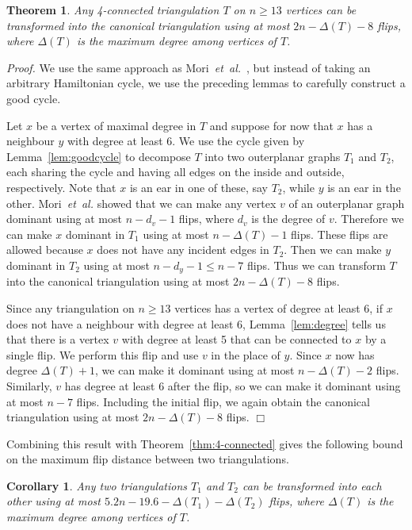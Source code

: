 \pdfoutput=1 \documentclass[12pt]{elsarticle}
\newtheorem{theo}[defin]{Theorem}
\newenvironment{theorem}{\begin{theo} \sl}{\end{theo}}
\newtheorem{coro}[defin]{Corollary}
\newenvironment{corollary}{\begin{coro} \sl}{\end{coro}}
\newenvironment{proof}{\emph{Proof.}}{\hfill $\Box$ \medskip\\}
\newcommand{\etal}{\emph{et~al.}\xspace}
\begin{document}
\begin{theorem}
\label{thm:canonical}
Any 4-connected triangulation $T$ on $n \geq 13$ vertices can be transformed into the canonical triangulation using at most $2n - \Delta(T) - 8$ flips, where $\Delta(T)$ is the maximum degree among vertices of $T$.
\end{theorem}
\begin{proof}
We use the same approach as Mori~\etal~\cite{mori2003diagonal}, but instead of taking an arbitrary Hamiltonian cycle, we use the preceding lemmas to carefully construct a good cycle.

Let $x$ be a vertex of maximal degree in $T$ and suppose for now that $x$ has a neighbour $y$ with degree at least 6. We use the cycle given by Lemma~\ref{lem:goodcycle} to decompose $T$ into two outerplanar graphs $T_1$ and $T_2$, each sharing the cycle and having all edges on the inside and outside, respectively. Note that $x$ is an ear in one of these, say $T_2$, while $y$ is an ear in the other. Mori~\etal showed that we can make any vertex $v$ of an outerplanar graph dominant using at most $n - d_v - 1$ flips, where $d_v$ is the degree of $v$. Therefore we can make $x$ dominant in $T_1$ using at most $n - \Delta(T) - 1$ flips. These flips are allowed because $x$ does not have any incident edges in $T_2$. Then we can make $y$ dominant in $T_2$ using at most $n - d_y - 1 \leq n - 7$ flips. Thus we can transform $T$ into the canonical triangulation using at most $2n - \Delta(T) - 8$ flips.

Since any triangulation on $n \geq 13$ vertices has a vertex of degree at least 6, if $x$ does not have a neighbour with degree at least 6, Lemma~\ref{lem:degree} tells us that there is a vertex $v$ with degree at least 5 that can be connected to $x$ by a single flip. We perform this flip and use $v$ in the place of $y$. Since $x$ now has degree $\Delta(T) + 1$, we can make it dominant using at most $n - \Delta(T) - 2$ flips. Similarly, $v$ has degree at least 6 after the flip, so we can make it dominant using at most $n - 7$ flips. Including the initial flip, we again obtain the canonical triangulation using at most $2n - \Delta(T) - 8$ flips.
\end{proof}

\noindent Combining this result with Theorem~\ref{thm:4-connected} gives the following bound on the maximum flip distance between two triangulations.

\begin{corollary}
 Any two triangulations $T_1$ and $T_2$ can be transformed into each other using at most $5.2 n - 19.6 - \Delta(T_1) - \Delta(T_2)$ flips, where $\Delta(T)$ is the maximum degree among vertices of $T$.
\end{corollary}
\end{document}
